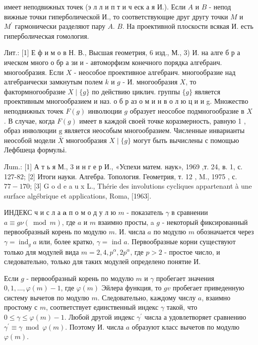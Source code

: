 \documentclass[10pt]{article}
\begin{document}
имеет неподвижных точек (э л л и п т и ч еск а я И.). Если $A$ и $B$ - непод вижные точки гиперболической И., то соответствующие друг другу точки $M$ и $M^{\prime}$ гармонически разделяют пару $A$. $B$. На проективной плоскости всякая И. есть гиперболическая гомология.



Лит.: [1] Е ф и м о в Н. В., Высшая геометрия, 6 изд., М., 3) И. на алге б р а ическом много о бр а зи и - автоморфизм конечного порядка алгебраич. многообразия. Если $X$ - неособое проективное алгебраич. многообразие над алгебраически замкнутым полем $k$ и $g$ - И. многообразия $X$, то фактормногообразие $X \mid\{g\}$ по действию циклич. группы $\{g\}$ является проективным многообразием и наз. о б р аз о м и н в о л ю ц и и g. Множество неподвижных точек $F(g)$ инволюции $g$ образует неособое подмногообразие в $X$. В случае, когда $F(g)$ имеет в каждой своей точке коразмерность, равную 1 , образ инволюции $\mathrm{g}$ является неособым многообразием. Численные инварианты неособой модели $\bar{X}$ многообразия $X \mid\{g\}$ могут быть вычислены с помощью Лефбшеца формульі.



Лum.: [1] А т ь я М., 3 и н г е р И., «Успехи матем. наук», 1969 ,т. 24, в. 1, с. 127-82; [2] Итоги науки. Алгебра. Топология. Геометрия, т. 12 , M., 1975 , с. $77-170$; [3] G o d e a u x L., Thérie des involutions cycliques appartenant à une surface algébrique et applications, Roma, [1963].



ИНДЕКС ч и с л а $\boldsymbol{a}$ п о м о д у л ю $m$ - показатель $\gamma$ в сравнении $a \equiv g \nu(\bmod m)$, где $a$ и $m$ взаимно просты, a $g$ - некоторый фиксированный первообразный корень по модулю $m$. И. числа $a$ по модулю $m$ обозначается через $\gamma=\operatorname{ind}_{g} a$ или, более кратко, $\gamma=$ ind $a$. Первообразные корни существуют только для модулей вида $m=2,4, p^{\alpha}, 2 p^{\alpha}$, где $p>2$ - простое число, и следовательно, только для таких модулей определено понятие И.



Если $g$ - первообразный корень по модулю $m$ и $\gamma$ пробегает значения $0,1, \ldots, \varphi(m)-1$, где $\varphi(m)$ Эйлера функция, то $g v$ пробегает приведенную систему вычетов по модулю $m$. Следовательно, каждому числу $a$, взаимно простому с $m$, соответствует единственный индекс $\gamma$ такой, что $0 \leqslant \gamma \leqslant \varphi(m)-1$. Любой другой индекс $\gamma^{\prime}$ числа $а$ удовлетворяет сравнению $\gamma^{\prime} \equiv \gamma \bmod \varphi(m)$. Поэтому И. числа $a$ образуют класс вычетов по модулю $\varphi(m)$.
\end{document}

